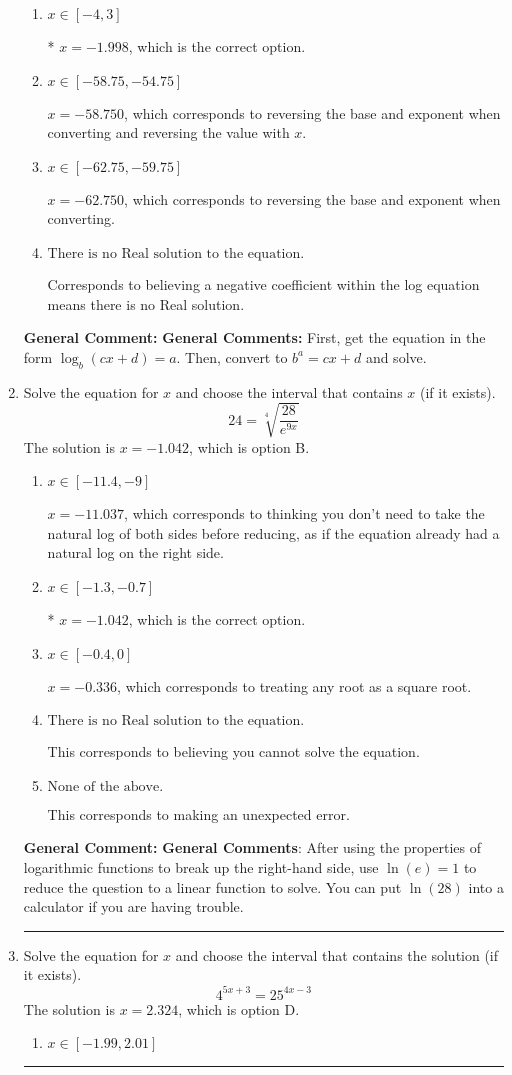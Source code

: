 \documentclass{extbook}[14pt]
\newcommand{\litem}[1]{\item #1

\rule{\textwidth}{0.4pt}}
\begin{document}
\begin{enumerate}
{\begin{enumerate}[label=\Alph*.]
$x = 4.250$, which corresponds to ignoring the vertical shift when converting to exponential form.
\item \( x \in [-4, 3] \)

* $x = -1.998$, which is the correct option.
\item \( x \in [-58.75, -54.75] \)

$x = -58.750$, which corresponds to reversing the base and exponent when converting and reversing the value with $x$.
\item \( x \in [-62.75, -59.75] \)

$x = -62.750$, which corresponds to reversing the base and exponent when converting.
\item \( \text{There is no Real solution to the equation.} \)

Corresponds to believing a negative coefficient within the log equation means there is no Real solution.
\end{enumerate}

\textbf{General Comment:} \textbf{General Comments:} First, get the equation in the form $\log_b{(cx+d)} = a$. Then, convert to $b^a = cx+d$ and solve.
}
\litem{
 Solve the equation for $x$ and choose the interval that contains $x$ (if it exists).
\[  24 = \sqrt[4]{\frac{28}{e^{9x}}} \]The solution is \( x = -1.042 \), which is option B.\begin{enumerate}[label=\Alph*.]
\item \( x \in [-11.4, -9] \)

$x = -11.037$, which corresponds to thinking you don't need to take the natural log of both sides before reducing, as if the equation already had a natural log on the right side.
\item \( x \in [-1.3, -0.7] \)

* $x = -1.042$, which is the correct option.
\item \( x \in [-0.4, 0] \)

$x = -0.336$, which corresponds to treating any root as a square root.
\item \( \text{There is no Real solution to the equation.} \)

This corresponds to believing you cannot solve the equation.
\item \( \text{None of the above.} \)

This corresponds to making an unexpected error.
\end{enumerate}

\textbf{General Comment:} \textbf{General Comments}: After using the properties of logarithmic functions to break up the right-hand side, use $\ln(e) = 1$ to reduce the question to a linear function to solve. You can put $\ln(28)$ into a calculator if you are having trouble.
}
\litem{
Solve the equation for $x$ and choose the interval that contains the solution (if it exists).
\[ 4^{5x+3} = 25^{4x-3} \]The solution is \( x = 2.324 \), which is option D.\begin{enumerate}[label=\Alph*.]
\item \( x \in [-1.99, 2.01] \)


\end{enumerate}}
\end{enumerate}
\end{document}
